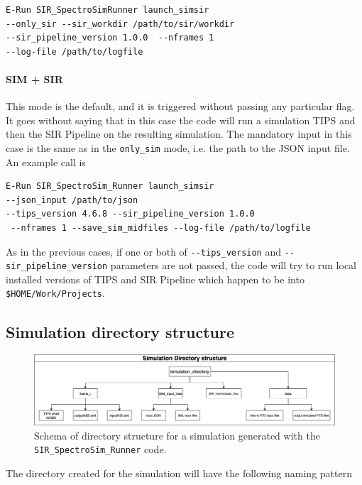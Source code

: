 \begin{verbatim}
E-Run SIR_SpectroSimRunner launch_simsir 
--only_sir --sir_workdir /path/to/sir/workdir
--sir_pipeline_version 1.0.0  --nframes 1
--log-file /path/to/logfile
\end{verbatim}

\paragraph{SIM + SIR}
This mode is the default, and it is triggered without passing any particular flag. It goes without saying that in this case the code will run a simulation TIPS and then the SIR Pipeline on the resulting simulation. The mandatory input in this case is the same as in the \verb+only_sim+ mode, i.e. the path to the JSON input file. An example call is

\begin{verbatim}
E-Run SIR_SpectroSim_Runner launch_simsir 
--json_input /path/to/json
--tips_version 4.6.8 --sir_pipeline_version 1.0.0
 --nframes 1 --save_sim_midfiles --log-file /path/to/logfile
\end{verbatim}

As in the previous cases, if one or both of \verb+--tips_version+ and \verb+--sir_pipeline_version+ parameters are not passed, the code will try to run local installed versions of TIPS and SIR Pipeline which happen to be into \verb+$HOME/Work/Projects+.

\subsection{Simulation directory structure}

\begin{figure}
\centering
\includegraphics[scale=0.325]{figures/TIPS_usage-sir_runner_dir_structure.png}
\caption{Schema of directory structure for a simulation generated with the \texttt{SIR\_SpectroSim\_Runner} code.}
\label{fig:sim_dir_tree}
\end{figure}

The directory created for the simulation will have the following naming pattern

